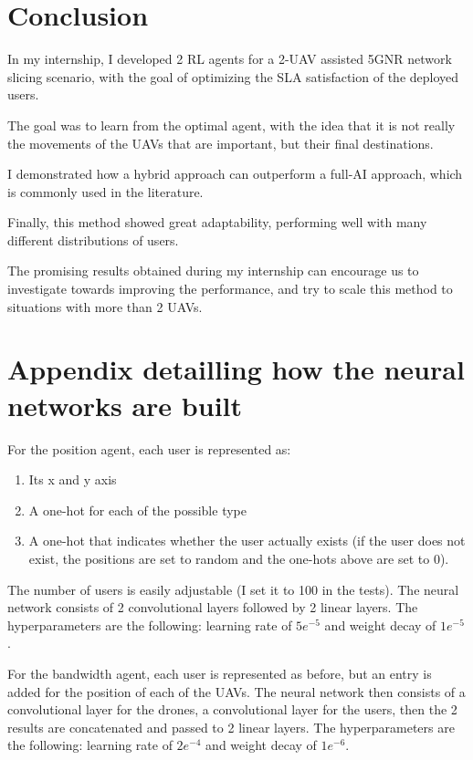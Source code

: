\documentclass[letterpaper]{article}
\begin{document}
\section{Conclusion}

In my internship, I developed 2 RL agents for a 2-UAV assisted 5GNR network slicing scenario, with the goal of optimizing the SLA satisfaction of the deployed users.

The goal was to learn from the optimal agent, with the idea that it is not really the movements of the UAVs that are important,
but their final destinations.

I demonstrated how a hybrid approach can outperform a full-AI approach, which is commonly used in the literature.

Finally, this method showed great adaptability, performing well with many different distributions of users.

The promising results obtained during my internship can encourage us to investigate towards improving the performance,
and try to scale this method to situations with more than 2 UAVs.






\appendix

\section{Appendix detailling how the neural networks are built}
\label{appendix}

For the position agent, each user is represented as:
\begin{enumerate}
    \item Its x and y axis
    \item A one-hot for each of the possible type
    \item A one-hot that indicates whether the user actually exists (if the user does not exist, the positions are set to random and the one-hots above are set to 0).
\end{enumerate}

The number of users is easily adjustable (I set it to 100 in the tests).
The neural network consists of 2 convolutional layers followed by 2 linear layers.
The hyperparameters are the following: learning rate of $5e^{-5}$ and weight decay of $1e^{-5}$.

\;

For the bandwidth agent, each user is represented as before, but an entry is added for the position of each of the UAVs.
The neural network then consists of a convolutional layer for the drones, a convolutional layer for the users,
then the 2 results are concatenated and passed to 2 linear layers.
The hyperparameters are the following: learning rate of $2e^{-4}$ and weight decay of $1e^{-6}$.
\end{document}
